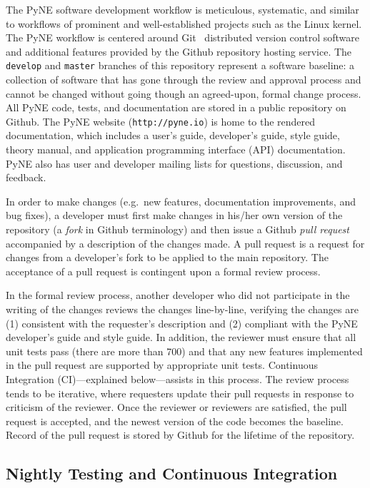 \documentclass{anstrans}
\begin{document}
The PyNE software development workflow is meticulous, systematic, and similar
to workflows of prominent and well-established projects such as the Linux kernel.
The PyNE workflow is centered around Git~\cite{git_2014} distributed version control software
and additional features provided by the Github repository hosting service.
The \texttt{develop} and \texttt{master} branches of this repository represent
a software baseline: a collection of software that has gone through the review and
approval process and cannot be changed without going though an agreed-upon, formal change process.
All PyNE code, tests, and documentation are stored in a public
repository on Github. The PyNE website (\texttt{http://pyne.io}) is home to the
rendered documentation, which includes a user's guide, developer's guide, style
guide, theory manual, and application programming interface (API) documentation.
PyNE also has user and developer mailing lists for questions, discussion, and feedback.

In order to make changes (e.g.\ new features, documentation improvements, and
bug fixes), a developer must first make changes in his/her own version of the
repository (a \emph{fork} in Github terminology) and then issue a Github \emph{pull
request} accompanied by a description of the changes made. A pull request
is a request for changes from a developer's fork to be applied to the main
repository. The acceptance of a pull request is contingent upon a formal review process.

In the formal review process, another developer who did not participate in the writing of the changes
reviews the changes line-by-line, verifying the changes are (1) consistent with
the requester's description and (2) compliant with the PyNE
developer's guide and style guide. In addition, the reviewer must
ensure that all unit tests pass (there are more than 700) and that
any new features implemented in the pull request are supported by appropriate unit
tests. Continuous Integration (CI)---explained below---assists in this process.
The review process tends to be iterative, where requesters update their pull
requests in response to criticism of the reviewer. Once the reviewer or
reviewers are satisfied, the pull request is accepted, and the newest version of the
code becomes the baseline. Record of the pull request is stored by Github for the lifetime of the repository.

\subsection{Nightly Testing and Continuous Integration} 
\end{document}
